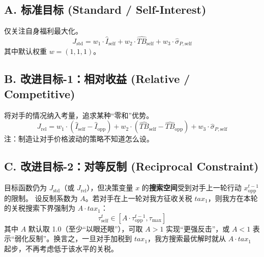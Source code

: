 \documentclass{ctexart}
\begin{document}
\subsection*{A. 标准目标 (Standard / Self-Interest)}
仅关注自身福利最大化。
\[
J_{\text{std}} = w_1 \cdot \hat{I}_{\text{self}} + w_2 \cdot \widehat{TB}_{\text{self}} + w_3 \cdot \hat{\sigma}_{P, \text{self}}
\]
其中默认权重 $w=(1, 1, 1)$。

\subsection*{B. 改进目标-1：相对收益 (Relative / Competitive)}
将对手的情况纳入考量，追求某种“零和”优势。
\[
J_{\text{rel}} = w_1 \cdot (\hat{I}_{\text{self}} - \hat{I}_{\text{opp}}) + w_2 \cdot (\widehat{TB}_{\text{self}} - \widehat{TB}_{\text{opp}}) + w_3 \cdot \hat{\sigma}_{P, \text{self}}
\]
注：制造让对手价格波动的策略不知道怎么设。

\subsection*{C. 改进目标-2：对等反制 (Reciprocal Constraint)}
目标函数仍为 $J_{\text{std}}$（或 $J_{\text{rel}}$），但决策变量 $x$ 的\textbf{搜索空间}受到对手上一轮行动 $x_{\text{opp}}^{t-1}$ 的限制。
设反制系数为 $A$。若对手在上一轮对我方征收关税 $tax_1$，则我方在本轮的关税搜索下界强制为 $A \cdot tax_1$：
\[
\tau_{\text{self}}^{t} \in [A \cdot \tau_{\text{opp}}^{t-1}, \tau_{\max}]
\]
其中 $A$ 默认取 1.0（至少“以眼还眼”），可取 $A>1$ 实现“更强反击”，或 $A<1$ 表示“弱化反制”。换言之，一旦对手加税到 $tax_1$，我方搜索最优解时就从 $A \cdot tax_1$ 起步，不再考虑低于该水平的关税。
\end{document}
